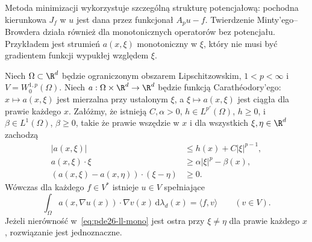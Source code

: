 \begin{uwaga}
Metoda minimizacji wykorzystuje szczególną strukturę
potencjałową: pochodna kierunkowa $J_f$ w $u$
jest dana przez funkcjonał $A_pu-f$. Twierdzenie Minty'ego--Browdera
działa również dla monotonicznych operatorów bez potencjału.
Przykładem jest strumień $a(x,\xi)$ monotoniczny w $\xi$,
który nie musi być gradientem funkcji wypukłej względem $\xi$.
\end{uwaga}


\begin{twierdzenie}
\label{thm:pde26-leraylions}
Niech $\Omega\subset\R^d$ będzie ograniczonym obszarem
Lipschitzowskim, $1<p<\infty$ i $V=W_0^{1,p}(\Omega)$.
Niech $a:\Omega\times\R^d\to\R^d$ będzie funkcją
Carathéodory'ego: $x\mapsto a(x,\xi)$ jest mierzalna
przy ustalonym $\xi$, a $\xi\mapsto a(x,\xi)$ jest
ciągła dla prawie każdego $x$. Załóżmy, że istnieją
$C,\alpha>0$, $h\in L^{p'}(\Omega)$, $h\ge0$,
i $\beta\in L^1(\Omega)$, $\beta\ge0$, takie że
prawie wszędzie w $x$ i dla wszystkich $\xi,\eta\in\R^d$
zachodzą
\begin{align}
 |a(x,\xi)|&\le h(x)+C|\xi|^{p-1},\label{eq:pde26-ll-growth}\\
 a(x,\xi)\cdot\xi&\ge\alpha|\xi|^p-\beta(x),\label{eq:pde26-ll-coerc}\\
 (a(x,\xi)-a(x,\eta))\cdot(\xi-\eta)&\ge0.\label{eq:pde26-ll-mono}
\end{align}
Wówczas dla każdego $f\in V^*$ istnieje $u\in V$
spełniające
\begin{equation}\label{eq:pde26-ll-weak}
 \int_\Omega a(x,\nabla u(x))\cdot\nabla v(x)
 \,\mathrm d\lambda_d(x)=\langle f,v\rangle
 \qquad(v\in V).
\end{equation}
Jeżeli nierówność w~\eqref{eq:pde26-ll-mono} jest ostra
przy $\xi\ne\eta$ dla prawie każdego $x$, rozwiązanie
jest jednoznaczne.
\end{twierdzenie}
